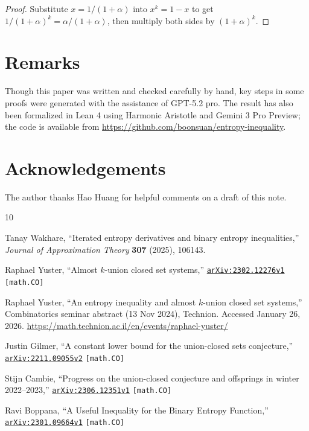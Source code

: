 \documentclass[twoside]{amsart} %
\begin{document}
\begin{proof}
Substitute $x=1/(1+\alpha)$ into $x^k=1-x$ to get
$1/(1+\alpha)^k=\alpha/(1+\alpha)$, then multiply both sides
by $(1+\alpha)^k$.
\end{proof}


\section{Remarks}
Though this paper was written and checked carefully by hand,
key steps in some proofs were generated with the assistance of GPT-5.2 pro.
The result has also been formalized in Lean 4 using Harmonic Aristotle
and Gemini 3 Pro Preview; the code is available from 
\url{https://github.com/boonsuan/entropy-inequality}.

\section{Acknowledgements}
The author thanks Hao Huang for helpful comments on a draft of this note.

\begin{thebibliography}{10}

Tanay Wakhare, 
``Iterated entropy derivatives and binary entropy inequalities,'' 
\textsl{Journal of Approximation Theory} 
\textbf{307} (2025), 106143.

Raphael Yuster, ``Almost $k$-union closed set systems,'' 
\href{https://arxiv.org/abs/2302.12276}{\texttt{arXiv:2302.12276v1}} \texttt{[math.CO]}

Raphael Yuster, ``An entropy inequality and almost $k$-union closed set systems,'' 
Combinatorics seminar abstract (13 Nov 2024), Technion. Accessed January 26, 2026. 
\url{https://math.technion.ac.il/en/events/raphael-yuster/}

Justin Gilmer, ``A constant lower bound for the union-closed sets conjecture,''
\href{https://arxiv.org/abs/2211.09055}{\texttt{arXiv:2211.09055v2}} \texttt{[math.CO]}

Stijn Cambie, 
``Progress on the union-closed conjecture and offsprings in winter 2022--2023,''
\href{https://arxiv.org/abs/2306.12351}{\texttt{arXiv:2306.12351v1}} \texttt{[math.CO]}

Ravi Boppana, ``A Useful Inequality for the Binary Entropy Function,''
\href{https://arxiv.org/abs/2301.09664}{\texttt{arXiv:2301.09664v1}} \texttt{[math.CO]}

\end{thebibliography}
\end{document}
